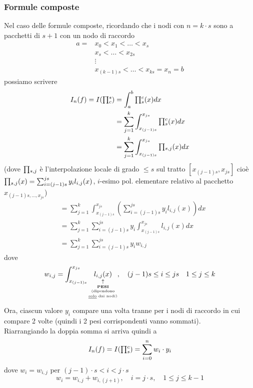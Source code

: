 \subsubsection{Formule composte}
Nel caso delle formule composte, ricordando che i nodi con $n=k\cdot s$ sono a pacchetti di $s+1$ con un nodo di raccordo
\begin{equation*}
    \begin{split}
        a = & x_0 < x_1 < \dotso < x_s \\
        & x_s < \dotso < x_ {2s} \\
        & \vdots \\
        & x_{(k-1)s} < \dotso < x_{ks} = x_n = b
    \end{split}
\end{equation*}
possiamo scrivere
\begin{equation*}
    \begin{split}
        I_n(f) = I(\begin{matrix}\prod\end{matrix}_c^s) & = \int_a^b \begin{matrix}\prod\end{matrix}_s^c(x) dx \\
        & = \sum_{j=1}^k \int_{x_{(j-1)s}}^{x_{js}} \begin{matrix}\prod\end{matrix}_s^c(x) dx \\
        & = \sum_{j=1}^k \int_{x_{(j-1)s}}^{x_{js}} \begin{matrix}\prod\end{matrix}_{s,j}(x) dx
    \end{split}
\end{equation*}
(dove $\begin{matrix}\prod\end{matrix}_{s,j}$ è l'interpolazione locale di grado $\leq s$ sul tratto $[x_{(j-1)s},x_{js}]$ cioè $\begin{matrix}\prod\end{matrix}_{s,j}(x)=\sum_{i=(j-1)s}^{js} y_i l_{i,j} (x)$, $i$-esimo pol. elementare relativo al pacchetto $x_{(j-1)s, \dotso , x_{js}}$)
\begin{equation*}
    \begin{split}
        & = \sum_{j=1}^k \int_{x_{(j-1)s}}^{x_{js}} \left(\sum_{i=(j-1)s}^{js} y_i l_{i,j}(x) \right) dx \\ 
        & = \sum_{j=1}^k \sum_{i=(j-1)s}^{js} y_i \int_{x_{(j-1)s}}^{x_{js}} l_{i,j}(x)dx \\
        & = \sum_{j=1}^k \sum_{i=(j-1)s}^{js} y_i w_{i,j}
    \end{split}
\end{equation*}
dove 
\[w_{i,j} = \int_{x_{(j-1)s}}^{x_{js}} \underset{\underset{\underset{\underset{\text{\uline{solo} dai nodi)}}{\text{(dipendono}}}{\textbf{PESI}}}{\uparrow}}{l_{i,j}(x)} , \quad (j-1)s \leq i \leq js \quad  1 \leq j \leq k\]
Ora, ciascun valore $y_i$ compare una volta tranne per i nodi di raccordo in cui compare 2 volte (quindi i 2 pesi corrispondenti vanno sommati).\\
Riarrangiando la doppia somma si arriva quindi a
\[
I_n (f) = I(\begin{matrix}\prod\end{matrix}_s^c) = \sum_{i=0}^n w_i \cdot y_i
\]
dove $w_i = w_{i,j}$ per $(j-1) \cdot s < i < j \cdot s$
\[
w_i = w_{i,j} + w_{i,(j+1)}, \quad i=j \cdot s, \quad 1 \leq j \leq k-1
\]

